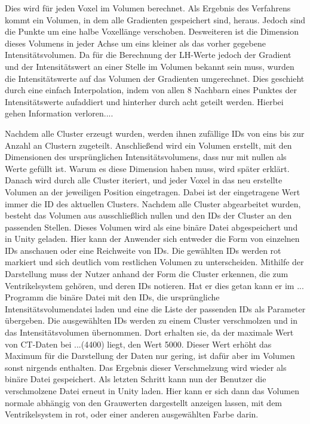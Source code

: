 Dies wird für jeden Voxel im Volumen berechnet. Als Ergebnis des Verfahrens kommt ein Volumen, in dem alle Gradienten gespeichert sind, heraus. Jedoch sind die Punkte um eine halbe Voxellänge verschoben. Desweiteren ist die Dimension dieses Volumens in jeder Achse um eins kleiner als das vorher gegebene Intensitätsvolumen.
Da für die Berechnung der LH-Werte jedoch der Gradient und der Intensitätswert an einer Stelle im Volumen bekannt sein muss, wurden die Intensitätswerte auf das Volumen der Gradienten umgerechnet. Dies geschieht durch eine einfach Interpolation, indem von allen 8 Nachbarn eines Punktes der Intensitätswerte aufaddiert und hinterher durch acht geteilt werden. Hierbei gehen Information verloren....




Nachdem alle Cluster erzeugt wurden, werden ihnen zufällige IDs von eins bis zur Anzahl an Clustern zugeteilt. Anschließend wird ein Volumen erstellt, mit den Dimensionen des ursprünglichen Intensitätsvolumens, dass nur mit nullen als Werte gefüllt ist. Warum es diese Dimension haben muss, wird später erklärt. Danach wird durch alle Cluster iteriert, und jeder Voxel in das neu erstellte Volumen an der jeweiligen Position eingetragen. Dabei ist der eingetragene Wert immer die  ID des aktuellen Clusters. Nachdem alle Cluster abgearbeitet wurden, besteht das Volumen aus ausschließlich nullen und den IDs der Cluster an den passenden Stellen.
\newline
Dieses Volumen wird als eine binäre Datei abgespeichert und in Unity geladen. Hier kann der Anwender sich entweder die Form von einzelnen IDs anschauen oder eine Reichweite von IDs. Die gewählten IDs werden rot markiert und sich deutlich vom restlichen Volumen zu unterscheiden. Mithilfe der Darstellung muss der Nutzer anhand der Form die Cluster erkennen, die zum Ventrikelsystem gehören, und deren IDs notieren. 
\newline
Hat er dies getan kann er im ... Programm die binäre Datei mit den IDs, die ursprüngliche Intensitätsvolumendatei laden und eine die Liste der passenden IDs als Parameter übergeben. Die ausgewählten IDs werden zu einem Cluster verschmolzen und in das Intensitätsvolumen übernommen. Dort erhalten sie, da der maximale Wert von CT-Daten bei ...(4400) liegt, den Wert 5000. Dieser Wert erhöht das Maximum für die Darstellung der Daten nur gering, ist dafür aber im Volumen sonst nirgends enthalten. Das Ergebnis dieser Verschmelzung wird wieder als binäre Datei gespeichert.
\newline
Als letzten Schritt kann nun der Benutzer die verschmolzene Datei erneut in Unity laden. Hier kann er sich dann das Volumen normale abhängig von den Grauwerten dargestellt anzeigen lassen, mit dem Ventrikelsystem in rot, oder einer anderen ausgewählten Farbe darin.
